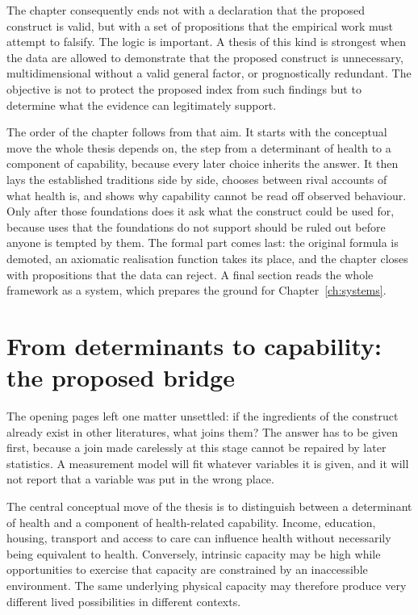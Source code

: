 The chapter consequently ends not with a declaration that the proposed construct is valid, but with a set of propositions that the empirical work must attempt to falsify. The logic is important. A thesis of this kind is strongest when the data are allowed to demonstrate that the proposed construct is unnecessary, multidimensional without a valid general factor, or prognostically redundant. The objective is not to protect the proposed index from such findings but to determine what the evidence can legitimately support.

The order of the chapter follows from that aim. It starts with the conceptual move the whole thesis depends on, the step from a determinant of health to a component of capability, because every later choice inherits the answer. It then lays the established traditions side by side, chooses between rival accounts of what health is, and shows why capability cannot be read off observed behaviour. Only after those foundations does it ask what the construct could be used for, because uses that the foundations do not support should be ruled out before anyone is tempted by them. The formal part comes last: the original formula is demoted, an axiomatic realisation function takes its place, and the chapter closes with propositions that the data can reject. A final section reads the whole framework as a system, which prepares the ground for Chapter~\ref{ch:systems}.

\section{From determinants to capability: the proposed bridge}
\label{sec:intro-bridge}

The opening pages left one matter unsettled: if the ingredients of the construct already exist in other literatures, what joins them? The answer has to be given first, because a join made carelessly at this stage cannot be repaired by later statistics. A measurement model will fit whatever variables it is given, and it will not report that a variable was put in the wrong place.

The central conceptual move of the thesis is to distinguish between a determinant of health and a component of health-related capability. Income, education, housing, transport and access to care can influence health without necessarily being equivalent to health. Conversely, intrinsic capacity may be high while opportunities to exercise that capacity are constrained by an inaccessible environment. The same underlying physical capacity may therefore produce very different lived possibilities in different contexts.

